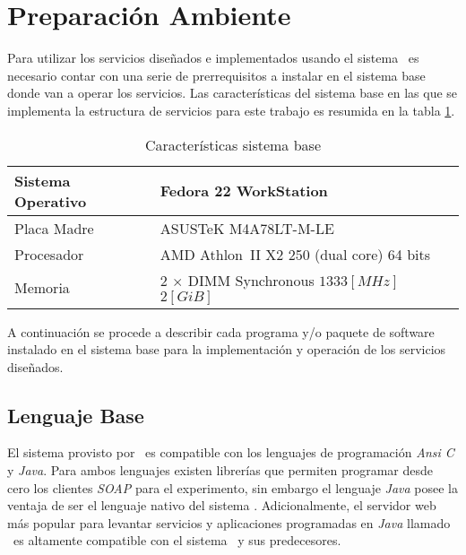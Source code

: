 \section{Preparación Ambiente}
\label{sec:2-ambiente}

  Para utilizar los servicios diseñados e implementados
  usando el sistema \ssdAxis\ 
  es necesario contar con una serie de prerrequisitos
  a instalar en el sistema base donde van a operar
  los servicios.
  Las características del sistema base
  en las que se implementa la estructura de servicios
  para este trabajo
  es resumida en la tabla \ref{tab:2-1-sistema-base}.

  \begin{table}[H]
    \centering
    \begin{tabular}{ll}
      \hline
      Sistema Operativo & Fedora 22 WorkStation \\
      \hline
      Placa Madre       & ASUSTeK M4A78LT-M-LE \\
      \hline
      Procesador        & AMD Athlon\texttrademark\ II X2 250 (dual core) 64 bits \\
      \hline
      Memoria           & 2 \(\times\)  DIMM Synchronous \(1333 [MHz]\) \(2 [GiB]\) \\
      \hline
    \end{tabular}
    \caption{Características sistema base}
    \label{tab:2-1-sistema-base}
  \end{table}

  A continuación se procede a describir
  cada programa y/o paquete de software
  instalado en el sistema base
  para la implementación y operación
  de los servicios diseñados.

\subsection{Lenguaje Base}
\label{subsec:2-1-lenguaje-base}

  El sistema provisto por \ssdAxis\
  es compatible con los lenguajes de programación
  \emph{Ansi C} y \emph{Java}.
  Para ambos lenguajes existen librerías que permiten
  programar desde cero los clientes
  \emph{SOAP} para el experimento,
  sin embargo el lenguaje \emph{Java}
  posee la ventaja de ser el lenguaje nativo
  del sistema \ssdAxis.
  Adicionalmente,
  el servidor web más popular para
  levantar servicios y aplicaciones
  programadas en \emph{Java}
  llamado \ssdTomcat\ 
  es altamente compatible con
  el sistema \ssdAxis\ y sus predecesores.

